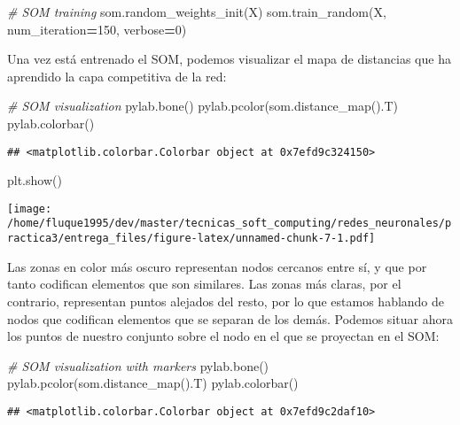 \documentclass[
  a4paper,
,tablecaptionabove
]{scrartcl}
\newenvironment{Shaded}{\begin{snugshade}}{\end{snugshade}}
\newcommand{\CommentTok}[1]{\textcolor[rgb]{0.56,0.35,0.01}{\textit{#1}}}
\newcommand{\DecValTok}[1]{\textcolor[rgb]{0.00,0.00,0.81}{#1}}
\newcommand{\NormalTok}[1]{#1}
\newcommand{\OperatorTok}[1]{\textcolor[rgb]{0.81,0.36,0.00}{\textbf{#1}}}
\begin{document}
\begin{Shaded}
\begin{Highlighting}[]
\CommentTok{# SOM training}
\NormalTok{som.random_weights_init(X)}
\NormalTok{som.train_random(X, num_iteration}\OperatorTok{=}\DecValTok{150}\NormalTok{, verbose}\OperatorTok{=}\DecValTok{0}\NormalTok{)}
\end{Highlighting}
\end{Shaded}

Una vez está entrenado el SOM, podemos visualizar el mapa de distancias
que ha aprendido la capa competitiva de la red:

\begin{Shaded}
\begin{Highlighting}[]
\CommentTok{# SOM visualization}
\NormalTok{pylab.bone()}
\NormalTok{pylab.pcolor(som.distance_map().T)}
\NormalTok{pylab.colorbar()}
\end{Highlighting}
\end{Shaded}

\begin{verbatim}
## <matplotlib.colorbar.Colorbar object at 0x7efd9c324150>
\end{verbatim}

\begin{Shaded}
\begin{Highlighting}[]
\NormalTok{plt.show()}
\end{Highlighting}
\end{Shaded}

\texttt{[image: /home/fluque1995/dev/master/tecnicas\_soft\_computing/redes\_neuronales/practica3/entrega\_files/figure-latex/unnamed-chunk-7-1.pdf]}

Las zonas en color más oscuro representan nodos cercanos entre sí, y que
por tanto codifican elementos que son similares. Las zonas más claras,
por el contrario, representan puntos alejados del resto, por lo que
estamos hablando de nodos que codifican elementos que se separan de los
demás. Podemos situar ahora los puntos de nuestro conjunto sobre el nodo
en el que se proyectan en el SOM:

\begin{Shaded}
\begin{Highlighting}[]
\CommentTok{# SOM visualization with markers}
\NormalTok{pylab.bone()}
\NormalTok{pylab.pcolor(som.distance_map().T)}
\NormalTok{pylab.colorbar()}
\end{Highlighting}
\end{Shaded}

\begin{verbatim}
## <matplotlib.colorbar.Colorbar object at 0x7efd9c2daf10>
\end{verbatim}
\end{document}
